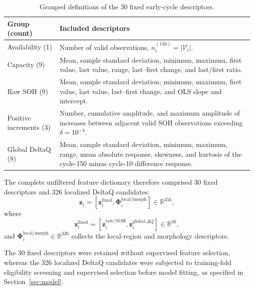 \documentclass[pdflatex,sn-mathphys-num]{sn-jnl}
\begin{document}
\begin{table}[!htbp]
\centering
\caption{Grouped definitions of the 30 fixed early-cycle descriptors.}
\label{tab:fixed_feature_definitions}
\small
\renewcommand{\arraystretch}{1.08}
\setlength{\tabcolsep}{5pt}

\begin{tabularx}{\textwidth}{
@{}
>{\centering\arraybackslash}m{}
>{\raggedright\arraybackslash}X
@{}
}
\toprule
\textbf{Group (count)} & \textbf{Included descriptors} \\
\midrule

Availability (1) & Number of valid observations, $n_i^{(150)}=|\mathcal{V}_i|$.
\\[4pt]

Capacity (9) & Mean, sample standard deviation, minimum, maximum, first value, last value, range, last--first change, and last/first ratio.
\\[4pt]

Raw SOH (9) & Mean, sample standard deviation, minimum, maximum, first value, last value, last--first change, and OLS slope and intercept.
\\[4pt]

Positive increments (3) & Number, cumulative amplitude, and maximum amplitude of increases between adjacent valid SOH observations exceeding $\delta=10^{-4}$.
\\[4pt]

Global DeltaQ (8) & Mean, sample standard deviation, minimum, maximum, range, mean absolute response, skewness, and kurtosis of the cycle-150 minus cycle-10 difference response.
\\

\bottomrule
\end{tabularx}
\end{table}

The complete unfiltered feature dictionary therefore comprised 30 fixed descriptors and 326 localized DeltaQ candidates:
\begin{equation}
\mathbf{z}_i
=
\left[
\mathbf{z}_i^{\mathrm{fixed}},
\boldsymbol{\Phi}_i^{\mathrm{local/morph}}
\right]
\in\mathbb{R}^{356},
\end{equation}
where
\[
\mathbf{z}_i^{\mathrm{fixed}}
=
\left[
\mathbf{z}_i^{\mathrm{raw/SOH}},
\mathbf{z}_i^{\mathrm{global}\,\Delta Q}
\right]
\in\mathbb{R}^{30},
\]
and $\boldsymbol{\Phi}_i^{\mathrm{local/morph}}\in\mathbb{R}^{326}$ collects the local-region and morphology descriptors.

The 30 fixed descriptors were retained without supervised feature selection, whereas the 326 localized DeltaQ candidates were subjected to training-fold eligibility screening and supervised selection before model fitting, as specified in Section~\ref{sec:model}.
\end{document}
